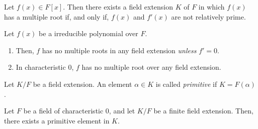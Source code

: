 \begin{prop}
	Let $f(x) \in F[x]$. Then there exists a field extension $K$ of $F$ in which $f(x)$ has a multiple root if, and only if, $f(x)$ and $f'(x)$ are not relatively prime.
\end{prop}

\begin{lem}
	Let $f(x)$ be a irreducible polynomial over $F$.
	\begin{enumerate}[label = (\alph*)]
		\item Then, $f$ has no multiple roots in any field extension \emph{unless} $f' = 0$.
		\item In characteristic $0$, $f$ has no multiple root over any field extension.
	\end{enumerate}
\end{lem}

\begin{defn}
	Let $K / F$ be a field extension. An element $\alpha \in K$ is called \emph{primitive} if $K = F(\alpha)$.
\end{defn}

\begin{thm}\label{l34:pet}
	Let $F$ be a field of characteristic $0$, and let $K / F$ be a finite field extension. Then, there exists a primitive element in $K$.
\end{thm}

